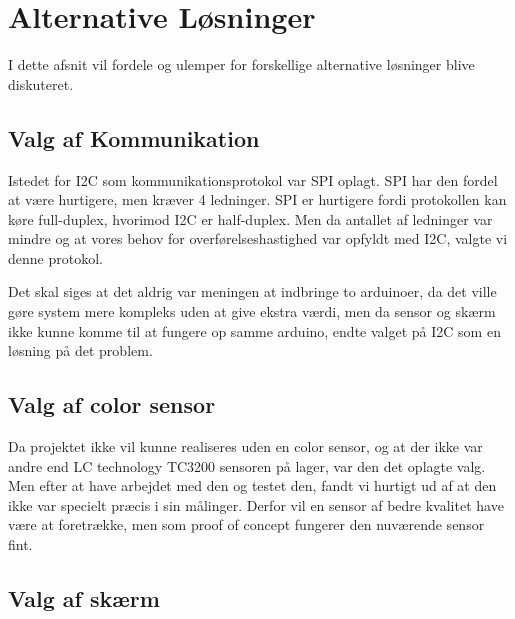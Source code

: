 \graphicspath{{Chapters/Alternative_Loesninger/}}


\section{Alternative Løsninger}
I dette afsnit vil fordele og ulemper for forskellige alternative løsninger blive diskuteret.

\subsection{Valg af Kommunikation}
Istedet for I2C som kommunikationsprotokol var SPI oplagt. SPI har den fordel at være hurtigere, men kræver 4 ledninger. SPI er hurtigere fordi protokollen kan køre full-duplex, hvorimod I2C er half-duplex. Men da antallet af ledninger var mindre og at vores behov for overførelseshastighed var opfyldt med I2C, valgte vi denne protokol.

Det skal siges at det aldrig var meningen at indbringe to arduinoer, da det ville gøre system mere kompleks uden at give ekstra værdi, men da sensor og skærm ikke kunne komme til at fungere op samme arduino, endte valget på I2C som en løsning på det problem.

\subsection{Valg af color sensor}
Da projektet ikke vil kunne realiseres uden en color sensor, og at der ikke var andre end LC technology TC3200 sensoren på lager, var den det oplagte valg. Men efter at have arbejdet med den og testet den, fandt vi hurtigt ud af at den ikke var specielt præcis i sin målinger. Derfor vil en sensor af bedre kvalitet have være at foretrække, men som proof of concept fungerer den nuværende sensor fint. 

\subsection{Valg af skærm}